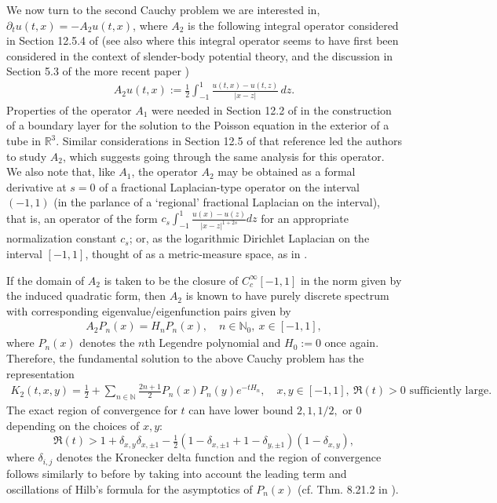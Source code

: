 \documentclass[letterpaper,10pt]{amsart}
\newcommand{\R}{\mathbb R}
\numberwithin{equation}{section}
\begin{document}
We now turn to the second Cauchy problem we are interested in, $\partial_t u(t,x)=-A_2u(t,x)$,
where $A_2$ is the following integral operator considered in Section 12.5.4 of \cite{MNP00} (see also \cite{T64} where this integral operator seems to have first been considered in the context of slender-body potential theory, and the discussion in Section 5.3 of the more recent paper \cite{GM25})
\begin{align}
    A_2u(t,x):=\frac{1}{2}\int_{-1}^1 \frac{u(t,x)-u(t,z)}{|x-z|}\,dz.
\end{align}
Properties of the operator $A_1$ were needed in Section 12.2 of \cite{MNP00} in the construction of a boundary layer for the solution to the Poisson equation in the exterior of a tube in $\R^3$. Similar considerations in Section 12.5 of that reference led the authors to study $A_2$, which suggests going through the same analysis for this operator. We also note that, like $A_1$, the operator $A_2$ may be obtained as a formal derivative at $s=0$ of a fractional Laplacian-type operator on the interval $(-1,1)$ (in the parlance of \cite{GS19} a `regional' fractional Laplacian on the interval), that is, an operator of the form $c_s\int_{-1}^1 \frac{u(x)-u(z)}{|x-z|^{1+2s}}dz$ for an appropriate normalization constant $c_s$; or, as the logarithmic Dirichlet Laplacian on the interval $[-1,1]$, thought of as a metric-measure space, as in \cite{GM25}.

If the domain of $A_2$ is taken to be the closure of $C_c^\infty[-1,1]$ in the norm given by the induced quadratic form, then $A_2$ is known to have purely discrete spectrum with corresponding eigenvalue/eigenfunction pairs given by
\begin{align}
    A_2 P_n(x)=H_nP_n(x),\quad n\in\mathbb{N}_0,\ x\in[-1,1],
\end{align}
where $P_n(x)$ denotes the $n$th Legendre polynomial and $H_0 := 0$ once again. Therefore, the fundamental solution to the above Cauchy problem has the representation
\begin{align}\label{Eq:SpecSer2}
    K_2(t,x,y) = \frac{1}{2}+\sum_{n\in\mathbb{N}} \frac{2n+1}{2}P_n(x)P_n(y)e^{-tH_n},\quad x,y\in[-1,1],\ \Re(t)>0 \text{ sufficiently large}.
\end{align}
The exact region of convergence for $t$ can have lower bound $2,1,1/2,$ or $0$ depending on the choices of $x,y$:
\begin{equation}
\Re(t)>1+\delta_{x,y}\delta_{x,\pm1}-\tfrac{1}{2}(1-\delta_{x,\pm1}+1-\delta_{y,\pm1})(1-\delta_{x,y}),
\end{equation}
where $\delta_{i,j}$ denotes the Kronecker delta function and the region of convergence follows similarly to before by taking into account the leading term and oscillations of Hilb's formula for the asymptotics of $P_n(x)$ (cf. Thm. 8.21.2 in \cite{Sz39}).
\end{document}
